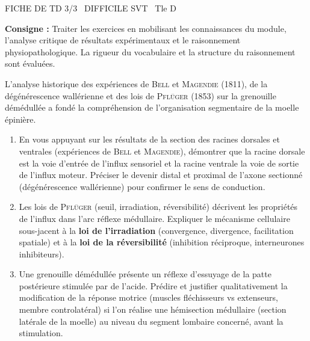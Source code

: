 \documentclass[11pt]{article}
\begin{document}
\begin{tcolorbox}[enhanced,colback=popink,colframe=popink,arc=10pt,boxrule=0pt,left=12pt,right=12pt,top=9pt,bottom=9pt]
{\color{white}\popxbold\small FICHE DE TD 3/3 \textbullet\ DIFFICILE \hfill SVT \textbullet\ Tle D\par}
\end{tcolorbox}
\vspace{4pt}
\noindent \textbf{Consigne :} Traiter les exercices en mobilisant les connaissances du module, l'analyse critique de résultats expérimentaux et le raisonnement physiopathologique. La rigueur du vocabulaire et la structure du raisonnement sont évaluées.

\begin{exercice}
L'analyse historique des expériences de \textsc{Bell} et \textsc{Magendie} (1811), de la dégénérescence wallérienne et des lois de \textsc{Pflüger} (1853) sur la grenouille démédullée a fondé la compréhension de l'organisation segmentaire de la moelle épinière.
\begin{enumerate}
    \item En vous appuyant sur les résultats de la section des racines dorsales et ventrales (expériences de \textsc{Bell} et \textsc{Magendie}), démontrer que la racine dorsale est la voie d'entrée de l'influx sensoriel et la racine ventrale la voie de sortie de l'influx moteur. Préciser le devenir distal et proximal de l'axone sectionné (dégénérescence wallérienne) pour confirmer le sens de conduction.
    \item Les lois de \textsc{Pflüger} (seuil, irradiation, réversibilité) décrivent les propriétés de l'influx dans l'arc réflexe médullaire. Expliquer le mécanisme cellulaire sous-jacent à la \textbf{loi de l'irradiation} (convergence, divergence, facilitation spatiale) et à la \textbf{loi de la réversibilité} (inhibition réciproque, interneurones inhibiteurs). 
    \item Une grenouille démédullée présente un réflexe d'essuyage de la patte postérieure stimulée par de l'acide. Prédire et justifier qualitativement la modification de la réponse motrice (muscles fléchisseurs vs extenseurs, membre controlatéral) si l'on réalise une hémisection médullaire (section latérale de la moelle) au niveau du segment lombaire concerné, avant la stimulation.
\end{enumerate}
\end{exercice}
\end{document}
